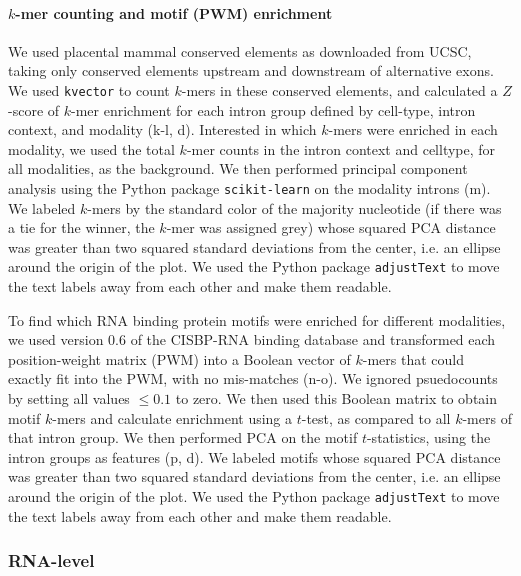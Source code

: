 \paragraph{$k$-mer counting and motif (PWM) enrichment}
We used placental mammal conserved elements as downloaded from UCSC\cite{Rosenbloom:2015bg}, taking only conserved elements upstream and downstream of alternative exons. We used \texttt{kvector}\cite{Anonymous:kvector} to count $k$-mers in these conserved elements, and calculated a $Z$-score of $k$-mer enrichment for each intron group defined by cell-type, intron context, and modality (k-l, d). Interested in which $k$-mers were enriched in each modality, we used the total $k$-mer counts in the intron context and celltype, for all modalities, as the background. We then performed principal component analysis using the Python package \texttt{scikit-learn} \cite{Pedregosa:2011tv} on the modality introns (m). We labeled $k$-mers by the standard color of the majority nucleotide (if there was a tie for the winner, the $k$-mer was assigned grey) whose squared PCA distance was greater than two squared standard deviations from the center, i.e. an ellipse around the origin of the plot. We used the Python package \texttt{adjustText}\cite{Anonymous:adjustText} to move the text labels away from each other and make them readable.

To find which RNA binding protein motifs were enriched for different modalities, we used version 0.6 of the CISBP-RNA binding database \cite{Ray:2013br} and transformed each position-weight matrix (PWM) into a Boolean vector of $k$-mers that could exactly fit into the PWM, with no mis-matches (n-o). We ignored psuedocounts by setting all values $\leq 0.1$ to zero. We then used this Boolean matrix to obtain motif $k$-mers and calculate enrichment using a $t$-test, as compared to all $k$-mers of that intron group. We then performed PCA on the motif $t$-statistics, using the intron groups as features (p, d). We labeled motifs whose squared PCA distance was greater than two squared standard deviations from the center, i.e. an ellipse around the origin of the plot. We used the Python package \texttt{adjustText}\cite{Anonymous:tk} to move the text labels away from each other and make them readable.


\subsubsection{RNA-level}

